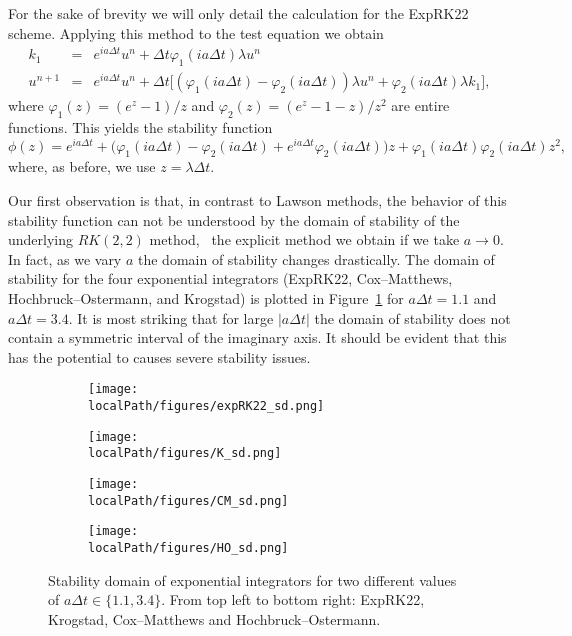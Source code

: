 For the sake of brevity we will only detail the calculation for the ExpRK22 scheme. Applying this method to the test equation we obtain
\begin{eqnarray*}
  k_1&=&e^{ia\Delta t}u^n + \Delta t\varphi_1(ia\Delta t)\lambda u^n\nonumber\\
  u^{n+1}&=& e^{ia\Delta t}u^n + \Delta t \Big[ (\varphi_1(ia\Delta t)-\varphi_2(ia\Delta t))\lambda u^n + \varphi_2(ia\Delta t)\lambda k_1\Big], 
\end{eqnarray*}
where $\varphi_1(z)=(e^{z}-1)/z$ and $\varphi_2(z)=(e^{z}-1-z)/z^2$ are entire functions. This yields the stability function
\[
  \phi(z) = e^{ia\Delta t} + \Big(\varphi_1(ia\Delta t)-\varphi_2(ia\Delta t)+e^{ia\Delta t}\varphi_2(ia\Delta t)\Big)z + \varphi_1(ia\Delta t)\varphi_2(ia\Delta t)z^2,
\]
where, as before, we use $z=\lambda \Delta t$.

Our first observation is that, in contrast to Lawson methods, the behavior of this stability function can not be understood by the domain of stability of the underlying $RK(2, 2)$ method, \ie~the explicit method we obtain if we take $a \to 0$. In fact, as we vary $a$ the domain of stability changes drastically. The domain of stability for the four exponential integrators (ExpRK22, Cox--Matthews, Hochbruck--Ostermann, and Krogstad) is plotted in Figure~\ref{fig:expRK_sd} for $a\Delta t=1.1$ and $a\Delta t=3.4$. It is most striking that for large $\vert a\Delta t \vert$ the domain of stability does not contain a symmetric interval of the imaginary axis. It should be evident that this has the potential to causes severe stability issues.

\begin{figure}[h]
	\centering
	\begin{subfigure}[b]{0.3\textwidth}
		\centering \texttt{[image: \\localPath/figures/expRK22\_sd.png]}
	\end{subfigure}
	\begin{subfigure}[b]{0.3\textwidth}
		\centering \texttt{[image: \\localPath/figures/K\_sd.png]}
	\end{subfigure}

	\begin{subfigure}[b]{0.3\textwidth}
		\centering \texttt{[image: \\localPath/figures/CM\_sd.png]}
	\end{subfigure}
		\begin{subfigure}[b]{0.3\textwidth}
		\centering \texttt{[image: \\localPath/figures/HO\_sd.png]}
	\end{subfigure}
    \caption{Stability domain of exponential integrators for two different values of $a\Delta t\in\{1.1, 3.4\}$.  From top left to bottom right: ExpRK22,  Krogstad, Cox--Matthews and Hochbruck--Ostermann.}  
	\label{fig:expRK_sd}
\end{figure}




